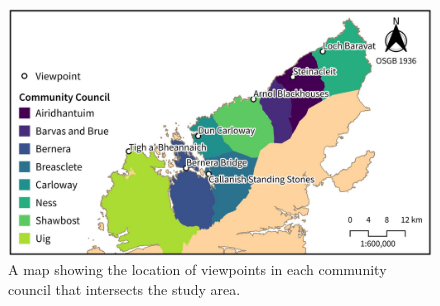 \begin{figure}
  \centering
  \includegraphics{images/maps/viewpoints}
  \caption{A map showing the location of viewpoints in each community council that intersects the study area. \label{fig:vp-loc}}
\end{figure}

